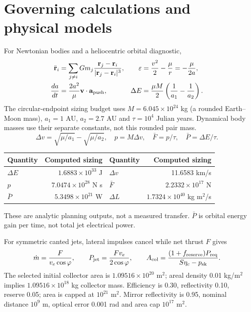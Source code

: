 ﻿\documentclass[10pt,a4paper]{article}
\begin{document}
\section{Governing calculations and physical models}
For Newtonian bodies and a heliocentric orbital diagnostic,
\begin{align}
\ddot{\mathbf r}_i&=\sum_{j\ne i}Gm_j\frac{\mathbf r_j-\mathbf r_i}{|\mathbf r_j-\mathbf r_i|^3},&
\varepsilon&=\frac{v^2}{2}-\frac{\mu}{r}=-\frac{\mu}{2a},\\
\frac{da}{dt}&=\frac{2a^2}{\mu}\mathbf v\cdot\mathbf a_{\rm push},&
\Delta E&=\frac{\mu M}{2}\left(\frac1{a_1}-\frac1{a_2}\right).
\end{align}
The circular-endpoint sizing budget uses $M=6.045\times10^{24}$ kg (a rounded Earth--Moon mass), $a_1=1$ AU, $a_2=2.7$ AU and $\tau=10^4$ Julian years. Dynamical body masses use their separate constants, not this rounded pair mass.
\[
\Delta v=\sqrt{\mu/a_1}-\sqrt{\mu/a_2},\quad p=M\Delta v,\quad
\bar F=p/\tau,\quad\bar P=\Delta E/\tau.
\]
\par\smallskip
{\small\noindent\begin{tabularx}{\linewidth}{@{}XrXr@{}}\toprule
Quantity & Computed sizing & Quantity & Computed sizing\\\midrule
$\Delta E$ & $1.6883\times10^{33}$ J & $\Delta v$ & 11.6583 km/s\\
$p$ & $7.0474\times10^{28}$ N s & $\bar F$ & $2.2332\times10^{17}$ N\\
$\bar P$ & $5.3498\times10^{21}$ W & $\Delta L$ & $1.7324\times10^{40}$ kg m$^2$/s\\\bottomrule
\end{tabularx}\par}
\smallskip

These are analytic planning outputs, not a measured transfer. $\bar P$ is orbital energy gain per time, not total jet electrical power.

For symmetric canted jets, lateral impulses cancel while net thrust $F$ gives
\[
\dot m=\frac{F}{v_e\cos\varphi},\qquad P_{\rm jet}=\frac{Fv_e}{2\cos\varphi},\qquad
A_{\rm col}=\frac{(1+f_{\rm reserve})P_{\rm req}}{S\eta_c-p_{\rm sk}}.
\]
The selected initial collector area is $1.09516\times10^{20}$ m$^2$; areal density 0.01 kg/m$^2$ implies $1.09516\times10^{18}$ kg collector mass. Efficiency is 0.30, reflectivity 0.10, reserve 0.05; area is capped at $10^{21}$ m$^2$. Mirror reflectivity is 0.95, nominal distance $10^9$ m, optical error 0.001 rad and area cap $10^{17}$ m$^2$.
\end{document}

